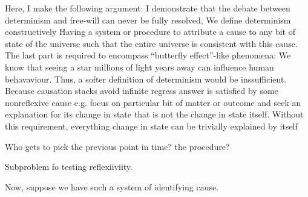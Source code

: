 \documentclass{article}
\begin{document}
Here, I make the following argument:
I demonstrate that the debate between determinism and free-will can never be fully resolved,
We define determinism constructively
Having a system or procedure to attribute a cause to any bit of state of the universe such that the entire universe is consistent with this cause.
The last part is required to encompass ``butterfly effect''-like phenomena: We know that seeing a star millions of light years away can influence human behavaviour.
Thus, a softer definition of determinism would be inssufficient.
Because causation stacks
avoid infinite regress
answer is satisfied by some nonreflexive cause
e.g. focus on particular bit of matter or outcome and seek an explanation for its change in state that is not the change in state itself.
Without this requirement, everything change in state can be trivially explained by itself

Who gets to pick the previous point in time? the procedure?

Subproblem fo testing reflexiiviity.

Now, suppose we have such a system of identifying cause.
\end{document}
